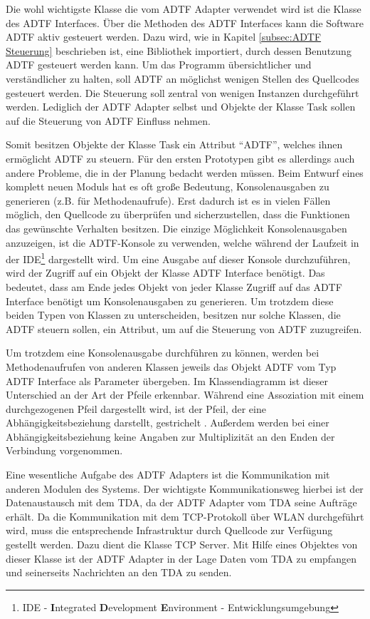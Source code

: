 \documentclass[12pt,a4paper]{report}
\begin{document}
Die wohl wichtigste Klasse die vom ADTF Adapter verwendet wird ist die Klasse des ADTF Interfaces. Über die Methoden des ADTF Interfaces kann die Software ADTF aktiv gesteuert werden. Dazu wird, wie in Kapitel \ref{subsec:ADTF Steuerung} beschrieben ist, eine Bibliothek importiert, durch dessen Benutzung ADTF gesteuert werden kann. Um das Programm übersichtlicher und verständlicher zu halten, soll ADTF an möglichst wenigen Stellen des Quellcodes gesteuert werden. Die Steuerung soll zentral von wenigen Instanzen durchgeführt werden. Lediglich der ADTF Adapter selbst und Objekte der Klasse Task sollen auf die Steuerung von ADTF Einfluss nehmen. 

Somit besitzen Objekte der Klasse Task ein Attribut "`ADTF"', welches ihnen ermög\-licht ADTF zu steuern. Für den ersten Prototypen gibt es allerdings auch andere Probleme, die in der Planung bedacht werden müssen. Beim Entwurf eines komplett neuen Moduls hat es oft große Bedeutung, Konsolenausgaben zu generieren (z.B. für Methodenaufrufe). Erst dadurch ist es in vielen Fällen möglich, den Quellcode zu überprüfen und sicherzustellen, dass die Funktionen das gewünschte Verhalten besitzen. Die einzige Möglichkeit Konsolenausgaben anzuzeigen, ist die ADTF-Konsole zu verwenden, welche während der Laufzeit in der IDE\footnote{IDE - \textbf{I}ntegrated \textbf{D}evelopment \textbf{E}nvironment - Entwicklungsumgebung} dargestellt wird. Um eine Ausgabe auf dieser Konsole durchzuführen, wird der Zugriff auf ein Objekt der Klasse ADTF Interface benötigt. Das bedeutet, dass am Ende jedes Objekt von jeder Klasse Zugriff auf das ADTF Interface benötigt um Konsolenausgaben zu generieren. Um trotzdem diese beiden Typen von Klassen zu unterscheiden, besitzen nur solche Klassen, die ADTF steuern sollen, ein Attribut, um auf die Steuerung von ADTF zuzugreifen. 

Um trotzdem eine Konsolenausgabe durchführen zu können, werden bei Methodenaufrufen von anderen Klassen jeweils das Objekt ADTF vom Typ ADTF Interface als Parameter übergeben. Im Klassendiagramm ist dieser Unterschied an der Art der Pfeile erkennbar. Während eine Assoziation mit einem durchgezogenen Pfeil dargestellt wird, ist der Pfeil, der eine Abhängigkeitsbeziehung darstellt, gestrichelt \cite{OestereichUML}. Außerdem werden bei einer Abhängigkeitsbeziehung keine Angaben zur Multiplizität an den Enden der Verbindung vorgenommen.

Eine wesentliche Aufgabe des ADTF Adapters ist die Kommunikation mit anderen Modulen des Systems. Der wichtigste Kommunikationsweg hierbei ist der Datenaustausch mit dem TDA, da der ADTF Adapter vom TDA seine Aufträge erhält. Da die Kommunikation mit dem TCP-Protokoll über WLAN durchgeführt wird, muss die entsprechende Infrastruktur durch Quellcode zur Verfügung gestellt werden. Dazu dient die Klasse TCP Server. Mit Hilfe eines Objektes von dieser Klasse ist der ADTF Adapter in der Lage Daten vom TDA zu empfangen und seinerseits Nachrichten an den TDA zu senden.
\end{document}
